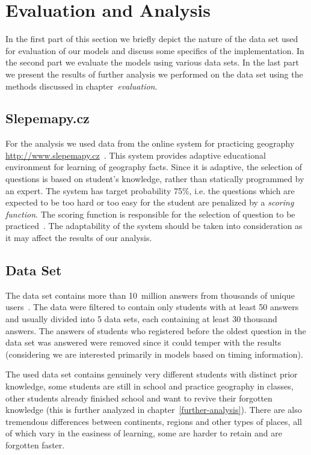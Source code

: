 \chapter{Evaluation and Analysis}

In the first part of this section we briefly depict the nature of the data set used for evaluation of our models and discuss some specifics of the implementation. In the second part we evaluate the models using various data sets. In the last part we present the results of further analysis we performed on the data set using the methods discussed in chapter~\textit{evaluation}.

\section{Slepemapy.cz}

For the analysis we used data from the online system for practicing geography \url{http://www.slepemapy.cz}~\cite{Papousek2014}. This system provides adaptive educational environment for learning of geography facts. Since it is adaptive, the selection of questions is based on student's knowledge, rather than statically programmed by an expert. The system has target probability 75\%, i.e. the questions which are expected to be too hard or too easy for the student are penalized by a \textit{scoring function}. The scoring function is responsible for the selection of question to be practiced~\cite{Stanislav2015thesis}. The adaptability of the system should be taken into consideration as it may affect the results of our analysis.

\section{Data Set}

The data set contains more than 10~million answers from thousands of unique users~\cite{Papousek2015}. The data were filtered to contain only students with at least 50 answers and usually divided into 5 data sets, each containing at least 30 thousand answers. The answers of students who registered before the oldest question in the data set was answered were removed since it could temper with the results (considering we are interested primarily in models based on timing information).

The used data set contains genuinely very different students with distinct prior knowledge, some students are still in school and practice geography in classes, other students already finished school and want to revive their forgotten knowledge (this is further analyzed in chapter~\ref{further-analysis}). There are also tremendous differences between continents, regions and other types of places, all of which vary in the easiness of learning, some are harder to retain and are forgotten faster.

